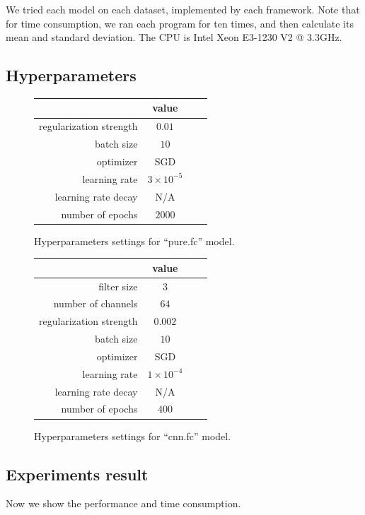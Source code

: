 \documentclass[a4paper]{article}
\begin{document}
We tried each model on each dataset, implemented by each framework.
Note that for time consumption, we ran each program for ten times, and then calculate its mean and standard deviation.
The CPU is Intel Xeon E3-1230 V2 @ 3.3GHz.

\subsection{Hyperparameters}

\begin{figure}[H]
\centering
\begin{tabular}{|r|c|c|c|}
\hline
 & value \\
\hline
regularization strength & $0.01$ \\
\hline
batch size & $10$ \\
\hline
optimizer & SGD \\
\hline
learning rate & $3\times10^{-5}$\\
\hline
learning rate decay & N/A \\
\hline
number of epochs & $2000$ \\
\hline
\end{tabular}
\caption{Hyperparameters settings for ``pure.fc'' model.}
\end{figure}

\begin{figure}[H]
\centering
\begin{tabular}{|r|c|c|c|}
\hline
 & value \\
\hline
filter size & $3$ \\
\hline
number of channels & $64$ \\
\hline
regularization strength & $0.002$ \\
\hline
batch size & $10$ \\
\hline
optimizer & SGD \\
\hline
learning rate & $1\times10^{-4}$\\
\hline
learning rate decay & N/A \\
\hline
number of epochs & $400$ \\
\hline
\end{tabular}
\caption{Hyperparameters settings for ``cnn.fc'' model.}
\end{figure}

\subsection{Experiments result}

Now we show the performance and time consumption.
\end{document}
